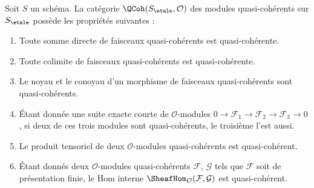 \begin{lemma}
\label{lemma-properties-quasi-coherent}
Soit $S$ un schéma. La catégorie $\QCoh(S_\etale, \mathcal{O})$ des modules
quasi-cohérents sur $S_\etale$ possède les propriétés suivantes :
\begin{enumerate}
\item Toute somme directe de faisceaux quasi-cohérents est quasi-cohérente.
\item Toute colimite de faisceaux quasi-cohérents est quasi-cohérente.
\item Le noyau et le conoyau d'un morphisme de faisceaux quasi-cohérents
sont quasi-cohérents.
\item Étant donnée une suite exacte courte de $\mathcal{O}$-modules
$0 \to \mathcal{F}_1 \to \mathcal{F}_2 \to \mathcal{F}_3 \to 0$,
si deux de ces trois modules sont quasi-cohérents, le troisième l'est aussi.
\item Le produit tensoriel de deux $\mathcal{O}$-modules quasi-cohérents
est quasi-cohérent.
\item Étant donnés deux $\mathcal{O}$-modules quasi-cohérents
$\mathcal{F}$, $\mathcal{G}$ tels que $\mathcal{F}$ soit de présentation
finie, le Hom interne
$\SheafHom_\mathcal{O}(\mathcal{F}, \mathcal{G})$
est quasi-cohérent.
\end{enumerate}
\end{lemma}

